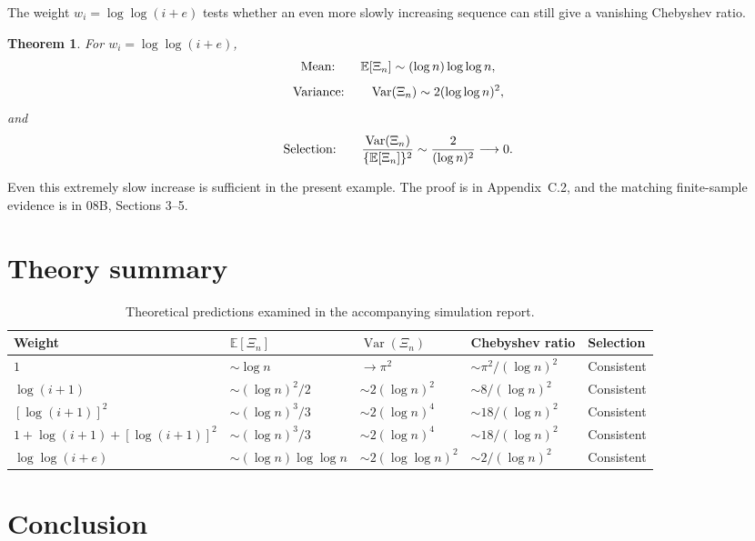 \documentclass[11pt]{article}
\newtheorem{theorem}{Theorem}[section]
\begin{document}
The weight $w_i=\log\log(i+e)$ tests whether an even more slowly increasing
sequence can still give a vanishing Chebyshev ratio.

\begin{theorem}\label{thm:loglog}
For $w_i=\log\log(i+e)$,
\[
\textnormal{Mean:}\qquad
\mathbb E[\Xi_n]\sim(\log n)\log\log n,
\]
\[
\textnormal{Variance:}\qquad
\operatorname{Var}(\Xi_n)\sim2(\log\log n)^2,
\]
and
\[
\textnormal{Selection:}\qquad
\frac{\operatorname{Var}(\Xi_n)}{\{\mathbb E[\Xi_n]\}^2}
\sim\frac{2}{(\log n)^2}\longrightarrow0.
\]
\end{theorem}

Even this extremely slow increase is sufficient in the present example.
The proof is in Appendix~C.2, and the matching finite-sample evidence is in
08B, Sections 3--5.

\section{Theory summary}

\begin{table}[ht]
\centering
\footnotesize
\setlength{\tabcolsep}{3pt}
\begin{tabular}{@{}>{\raggedright\arraybackslash}p{3.0cm}
>{\raggedright\arraybackslash}p{2.8cm}
>{\raggedright\arraybackslash}p{2.8cm}
>{\raggedright\arraybackslash}p{3.0cm}
>{\raggedright\arraybackslash}p{1.7cm}@{}}
\toprule
Weight & $\mathbb E[\Xi_n]$ & $\operatorname{Var}(\Xi_n)$
& Chebyshev ratio & Selection \\
\midrule
$1$ & $\sim\log n$ & $\to\pi^2$ & $\sim\pi^2/(\log n)^2$ & Consistent \\
$\log(i+1)$ & $\sim(\log n)^2/2$ & $\sim2(\log n)^2$
& $\sim8/(\log n)^2$ & Consistent \\
$[\log(i+1)]^2$ & $\sim(\log n)^3/3$ & $\sim2(\log n)^4$
& $\sim18/(\log n)^2$ & Consistent \\
$1+\log(i+1)+[\log(i+1)]^2$ & $\sim(\log n)^3/3$
& $\sim2(\log n)^4$ & $\sim18/(\log n)^2$ & Consistent \\
$\log\log(i+e)$ & $\sim(\log n)\log\log n$
& $\sim2(\log\log n)^2$ & $\sim2/(\log n)^2$ & Consistent \\
\bottomrule
\end{tabular}
\caption{Theoretical predictions examined in the accompanying simulation report.}
\end{table}

\section{Conclusion}
\end{document}
